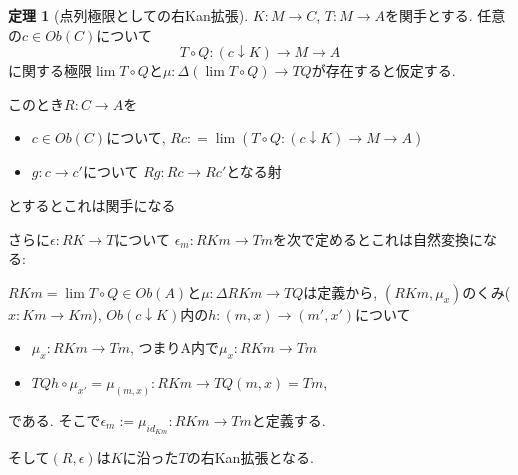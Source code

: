 \documentclass[dvipdfmx,a4paper,11pt]{article}
\theoremstyle{definition}
\newtheorem{thm}{定理}
\begin{document}
 \begin{tcolorbox}
 [colback = white, colframe = green!35!black, fonttitle = \bfseries,breakable = true]
\begin{thm}[点列極限としての右Kan拡張]
\label{thm-Kan-extension}
$K : M \to C$, $T : M \to A$を関手とする.
任意の$c \in Ob(C)$について
$$
T \circ Q : (c \downarrow K) \to M \to A
$$
に関する極限$\lim T\circ Q$と$\mu: \Delta (\lim T\circ Q) \to TQ$が存在すると仮定する.

このとき$R : C \to A$を
\begin{itemize}
\item $c \in Ob(C)$について, $Rc : = \lim (T \circ Q : (c \downarrow K) \to M \to A)$
\item $g : c \to c'$について $Rg : Rc \to Rc'$となる射
\end{itemize}
とするとこれは関手になる

さらに$\epsilon : RK \to T$について
$\epsilon_{m} : RKm \to Tm$を次で定めるとこれは自然変換になる: 

$RKm =\lim T\circ Q \in Ob(A)$と$\mu: \Delta RKm \to TQ$は定義から, 
$(RKm , \mu_{x})$のくみ($x : Km \to Km $), $Ob(c \downarrow K )$内の$h : (m,x)\to (m',x')$について
\begin{itemize}
\item $\mu_{x} : RKm \to Tm  $, つまりA内で$\mu_{x} :  RKm\to Tm $
\item $ TQ h  \circ \mu_{x'} = \mu_{(m,x)} :RKm \to  TQ(m,x) =Tm$, 
\end{itemize}
である. そこで$\epsilon_{m} := \mu_{ id_{Km}} : RKm \to Tm$と定義する.



そして$(R,\epsilon)$は$K$に沿った$T$の右Kan拡張となる. 

\end{thm}
\end{tcolorbox}
\end{document}
